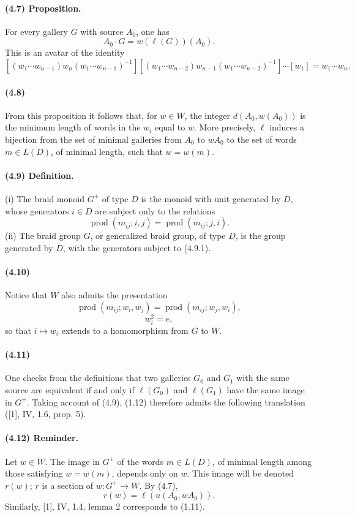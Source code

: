 \documentclass[10pt]{article}
\newcommand{\prodalt}{\operatorname{prod}}
\begin{document}
\paragraph{(4.7) Proposition.} For every gallery \(G\) with source \(A_0\), one has
\[
A_0\cdot G=w(\ell(G))(A_0).
\]
This is an avatar of the identity
\[
[(w_1\cdots w_{n-1})w_n(w_1\cdots w_{n-1})^{-1}]
[(w_1\cdots w_{n-2})w_{n-1}(w_1\cdots w_{n-2})^{-1}]
\cdots [w_1]=w_1\cdots w_n.
\]

\paragraph{(4.8)} From this proposition it follows that, for \(w\in W\), the integer \(d(A_0,w(A_0))\) is the minimum length of words in the \(w_i\) equal to \(w\). More precisely, \(\ell\) induces a bijection from the set of minimal galleries from \(A_0\) to \(wA_0\) to the set of words \(m\in L(D)\), of minimal length, such that \(w=w(m)\).

\paragraph{(4.9) Definition.} (i) The braid monoid \(G^+\) of type \(D\) is the monoid with unit generated by \(D\), whose generators \(i\in D\) are subject only to the relations
\[
\tag{4.9.1}
\prodalt(m_{ij};i,j)=\prodalt(m_{ij};j,i).
\]
(ii) The braid group \(G\), or generalized braid group, of type \(D\), is the group generated by \(D\), with the generators subject to (4.9.1).

\paragraph{(4.10)} Notice that \(W\) also admits the presentation
\[
\tag{4.10.1}
\prodalt(m_{ij};w_i,w_j)=\prodalt(m_{ij};w_j,w_i),
\]
\[
\tag{4.10.2}
w_i^2=e,
\]
so that \(i\mapsto w_i\) extends to a homomorphism from \(G\) to \(W\).

\paragraph{(4.11)} One checks from the definitions that two galleries \(G_0\) and \(G_1\) with the same source are equivalent if and only if \(\ell(G_0)\) and \(\ell(G_1)\) have the same image in \(G^+\). Taking account of (4.9), (1.12) therefore admits the following translation ([1], IV, 1.6, prop. 5).

\paragraph{(4.12) Reminder.} Let \(w\in W\). The image in \(G^+\) of the words \(m\in L(D)\), of minimal length among those satisfying \(w=w(m)\), depends only on \(w\). This image will be denoted \(r(w)\); \(r\) is a section of \(w:G^+\to W\). By (4.7),
\[
r(w)=\ell(u(A_0,wA_0)).
\]
Similarly, [1], IV, 1.4, lemma 2 corresponds to (1.11).
\end{document}

